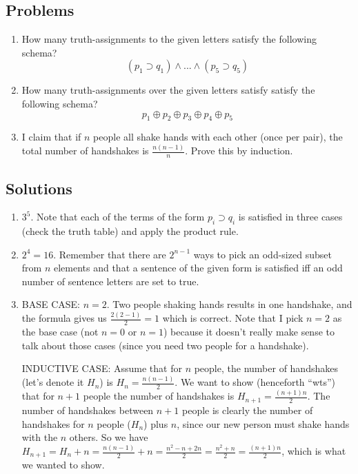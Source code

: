\newpage
\begin{mdframed}[linewidth=1]
\section*{Problems}
\begin{enumerate}
    \item How many truth-assignments to the given letters satisfy the following schema?
    \[
        (p_1 \supset q_1) \land ... \land (p_5 \supset q_5)
    \]

    \item How many truth-assignments over the given letters satisfy satisfy the following schema?
    \[
        p_1 \oplus p_2 \oplus p_3 \oplus p_4 \oplus p_5
    \]

    \item I claim that if $n$ people all shake hands with each other (once per pair), the total number of handshakes is $\frac{n(n-1)}{n}$. Prove this by induction. 
\end{enumerate}
\end{mdframed}
\newpage
\begin{mdframed}[linewidth=1]
\section*{Solutions}
\begin{enumerate}
    \item $3^5$. Note that each of the terms of the form $p_i \supset q_i$ is satisfied in three cases (check the truth table) and apply the product rule. 

    \item $2^4 = 16$. Remember that there are $2^{n-1}$ ways to pick an odd-sized subset from $n$ elements and that a sentence of the given form is satisfied iff an odd number of sentence letters are set to true. 

    \item BASE CASE: $n = 2$. Two people shaking hands results in one handshake, and the formula gives us $\frac{2(2-1)}{2} = 1$ which is correct. Note that I pick $n = 2$ as the base case (not $n = 0$ or $n = 1$) because it doesn't really make sense to talk about those cases (since you need two people for a handshake). 

    INDUCTIVE CASE: Assume that for $n$ people, the number of handshakes (let's denote it $H_n$) is $H_n = \frac{n(n-1)}{2}$. We want to show (henceforth ``wts'') that for $n + 1$ people the number of handshakes is $H_{n+1} = \frac{(n+1)n}{2}$. The number of handshakes between $n + 1$ people is clearly the number of handshakes for $n$ people ($H_n$) plus $n$, since our new person must shake hands with the $n$ others. So we have $H_{n+1} = H_n + n = \frac{n(n-1)}{2} + n = \frac{n^2 - n + 2n}{2} = \frac{n^2 + n}{2} = \frac{(n+1)n}{2}$, which is what we wanted to show. 

\end{enumerate}
\end{mdframed}
